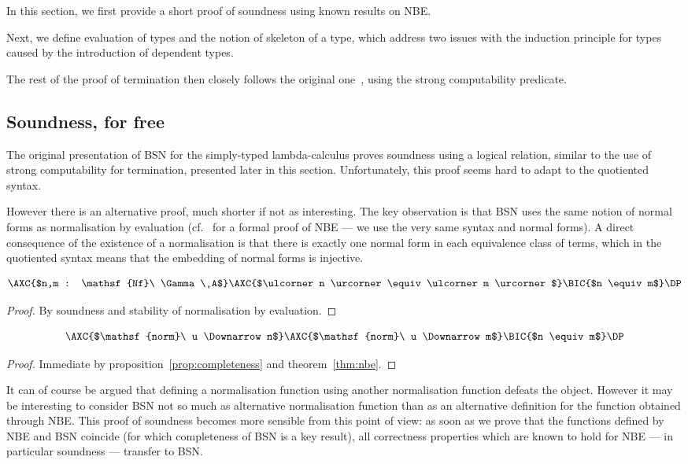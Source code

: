 \documentclass[a4paper,english]{lipics-v2019}
\newcommand{\agdaSymb}[1]{\mathsf{#1}}
\newcommand{\Nf}{\agdaSymb{Nf}}
\newcommand{\norm}{\agdaSymb{norm}}
\newcommand{\cul}{\ulcorner}
\newcommand{\cur}{\urcorner}
\newcommand{\Da}{\Downarrow}
\begin{document}
In this section, we first provide a short proof of soundness using known results
on NBE.

Next, we define evaluation of types and the notion of skeleton of a type, which
address two issues with the induction principle for types caused by the
introduction of dependent types. 

The rest of the proof of termination then closely follows the original
one~\cite{chapman2009bsn}, using the strong computability predicate.

\subsection{Soundness, for free}
The original presentation of BSN for the simply-typed lambda-calculus proves
soundness using a logical relation, similar to the use of strong computability
for termination, presented later in this section. Unfortunately, this proof
seems hard to adapt to the quotiented syntax.

However there is an alternative proof, much shorter if not as interesting.
The key observation is that BSN uses the same notion of normal forms as
normalisation by evaluation (cf.~\cite{kaposi2016normalisation} for a formal
proof of NBE --- we use the very same syntax and normal forms). A direct
consequence of the existence of a normalisation is that there is exactly one
normal form in each equivalence class of terms, which in the quotiented syntax
means that the embedding of normal forms is injective.
\begin{theorem}
  \label{thm:nbe}
  \[ \AXC{$n,m : \Nf\ \Gamma\ A$}\AXC{$\cul n \cur \equiv \cul m \cur$}\BIC{$n \equiv m$}\DP \]
\end{theorem}
\begin{proof}
  By soundness and stability of normalisation by evaluation.
\end{proof}

\begin{proposition}[Soundness]
  \label{prop:soundness}
  \[ \AXC{$\norm\ u \Da n$}\AXC{$\norm\ u \Da m$}\BIC{$n \equiv m$}\DP \]
\end{proposition}
\begin{proof}
  Immediate by proposition~\ref{prop:completeness} and theorem~\ref{thm:nbe}.
\end{proof}

It can of course be argued that defining a normalisation function using another
normalisation function defeats the object. However it may be interesting to
consider BSN not so much as alternative normalisation function than as an
alternative definition for the function obtained through NBE. This proof of
soundness becomes more sensible from this point of view: as soon as we prove
that the functions defined by NBE and BSN coincide (for which completeness of
BSN is a key result), all correctness properties which are known to hold for NBE
--- in particular soundness --- transfer to BSN.
\end{document}
